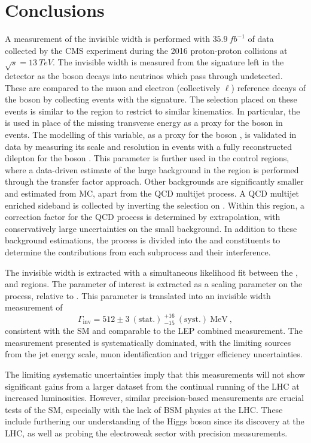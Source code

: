 \chapter{Conclusions}
\label{chap:summary}


A measurement of the \PZ invisible width is performed with $\SI{35.9}{fb^{-1}}$ of data collected by the CMS experiment during the 2016 proton-proton collisions at $\sqrt{s}=\SI{13}{TeV}$. The invisible width is measured from the \metplusjets signature left in the detector as the \PZ boson decays into neutrinos which pass through undetected. These are compared to the muon and electron (collectively $\ell$) reference decays of the \PZ boson by collecting events with the \diellplusjets signature. The selection placed on these events is similar to the \metplusjets region to restrict to similar kinematics. In particular, the \recoil is used in place of the missing transverse energy as a proxy for the boson \pt in \IVj events. The modelling of this variable, as a proxy for the boson \pt, is validated in data by measuring its scale and resolution in events with a fully reconstructed dilepton for the boson \pt. This parameter is further used in the \ellplusjets control regions, where a data-driven estimate of the large \IWlvj background in the \metplusjets region is performed through the transfer factor approach.  Other backgrounds are significantly smaller and estimated from MC, apart from the QCD multijet process. A QCD multijet enriched sideband is collected by inverting the selection on \mindphi. Within this region, a correction factor for the QCD process is determined by extrapolation, with conservatively large uncertainties on the small background. In addition to these background estimations, the \IDYll process is divided into the \IZll and \Igstarll constituents to determine the contributions from each subprocess and their interference.

The invisible width is extracted with a simultaneous likelihood fit between the \metplusjets, \ellplusjets and \diellplusjets regions. The parameter of interest is extracted as a scaling parameter on the \IZvvj process, relative to \IZllj.  This parameter is translated into an invisible width measurement of
%
\begin{equation}
    \Gamma_{\mathrm{inv}} = 512 \pm 3\ (\mathrm{stat.})\ ^{+16}_{-15}\ (\mathrm{syst.})\ \mathrm{MeV}\ ,
\end{equation}
%
consistent with the SM and comparable to the LEP combined measurement. The measurement presented is systematically dominated, with the limiting sources from the jet energy scale, muon identification and trigger efficiency uncertainties.

The limiting systematic uncertainties imply that this measurements will not show significant gains from a larger dataset from the continual running of the LHC at increased luminosities. However, similar precision-based measurements are crucial tests of the SM, especially with the lack of BSM physics at the LHC.  These include furthering our understanding of the Higgs boson since its discovery at the LHC, as well as probing the electroweak sector with precision measurements.
